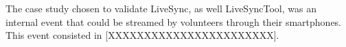 The case study chosen to validate LiveSync, as well LiveSyncTool, was an internal event that could be streamed by volunteers through their smartphones. This event consisted in [XXXXXXXXXXXXXXXXXXXXXXX].
